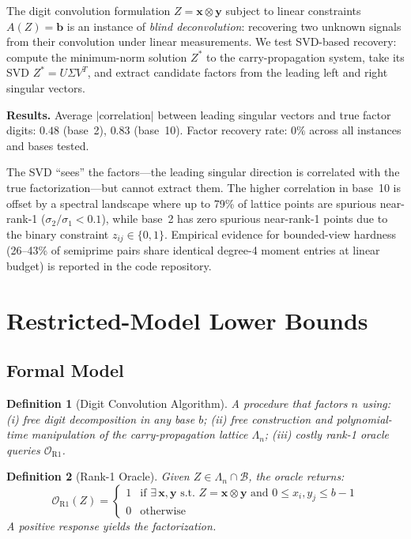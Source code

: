 \documentclass[11pt,a4paper]{article}
\newtheorem{definition}{Definition}
\begin{document}
The digit convolution formulation $Z = \mathbf{x} \otimes \mathbf{y}$ subject to linear constraints $A(Z) = \mathbf{b}$ is an instance of \emph{blind deconvolution}: recovering two unknown signals from their convolution under linear measurements.  We test SVD-based recovery: compute the minimum-norm solution $Z^*$ to the carry-propagation system, take its SVD $Z^* = U \Sigma V^T$, and extract candidate factors from the leading left and right singular vectors.

\textbf{Results.}  Average $|\text{correlation}|$ between leading singular vectors and true factor digits: $0.48$ (base~2), $0.83$ (base~10).  Factor recovery rate: $0\%$ across all instances and bases tested.

The SVD ``sees'' the factors---the leading singular direction is correlated with the true factorization---but cannot extract them.  The higher correlation in base~10 is offset by a spectral landscape where up to 79\% of lattice points are spurious near-rank-1 ($\sigma_2/\sigma_1 < 0.1$), while base~2 has zero spurious near-rank-1 points due to the binary constraint $z_{ij}\in\{0,1\}$.  Empirical evidence for bounded-view hardness (26--43\% of semiprime pairs share identical degree-4 moment entries at linear budget) is reported in the code repository.

\section{Restricted-Model Lower Bounds}
\label{sec:lower}

\subsection{Formal Model}

\begin{definition}[Digit Convolution Algorithm]
A procedure that factors $n$ using: (i) free digit decomposition in any base $b$; (ii) free construction and polynomial-time manipulation of the carry-propagation lattice $\Lambda_n$; (iii) costly rank-1 oracle queries $\mathcal{O}_{\mathrm{R1}}$.
\end{definition}

\begin{definition}[Rank-1 Oracle]
Given $Z \in \Lambda_n \cap \mathcal{B}$, the oracle returns:
\[
\mathcal{O}_{\mathrm{R1}}(Z) = \begin{cases} 1 & \text{if } \exists\, \mathbf{x}, \mathbf{y} \text{ s.t.\ } Z = \mathbf{x} \otimes \mathbf{y} \text{ and } 0 \le x_i, y_j \le b{-}1 \\ 0 & \text{otherwise} \end{cases}
\]
A positive response yields the factorization.
\end{definition}
\end{document}
